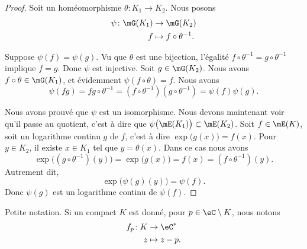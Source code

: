 \begin{proof}
    Soit un homéomorphisme \( \theta\colon K_1\to K_2\). Nous posons
    \begin{equation}
        \begin{aligned}
            \psi\colon \mG(K_1)&\to \mG(K_2)  \\
            f&\mapsto f\circ \theta^{-1}. 
        \end{aligned}
    \end{equation}
    \begin{subproof}
        \spitem[Injective]
        Suppose \( \psi(f)=\psi(g)\). Vu que \( \theta\) est une bijection, l'égalité \( f\circ \theta^{-1}=g\circ\theta^{-1}\) implique \( f=g\). Donc \( \psi\) est injective.
        \spitem[Surjective]
        Soit \( g\in\mG(K_2)\). Nous avons \( f\circ\theta\in\mG(K_1)\), et évidemment \( \psi(f\circ\theta)=f\).
        \spitem[Morphisme]
         Nous avons 
         \begin{equation}
             \psi(fg)=fg\circ\theta^{-1}=(f\circ\theta^{-1})(g\circ\theta^{-1})=\psi(f)\psi(g).
         \end{equation}
    \end{subproof}
    Nous avons prouvé que \( \psi\) est un isomorphisme. Nous devons maintenant voir qu'il passe au quotient, c'est à dire que \( \psi\big( \mE(K_1) \big)\subset\mE(K_2)\). Soit \( f\in\mE(K)\), soit un logarithme continu \( g\) de \( f\), c'est à dire \( \exp\big( g(x) \big)=f(x)\). Pour \( y\in K_2\), il existe \( x\in K_1\) tel que \( y=\theta(x)\). Dans ce cas nous avons
    \begin{equation}
        \exp\big( (g\circ\theta^{-1})(y) \big)=\exp\big( g(x) \big)=f(x)=(f\circ\theta^{-1})(y).
    \end{equation}
    Autrement dit,
    \begin{equation}
        \exp\big( \psi(g)(y) \big)=\psi(f).
    \end{equation}
    Donc \( \psi(g)\) est un logarithme continu de \( \psi(f)\).
\end{proof}

Petite notation. Si un compact \( K\) est donné, pour \( p\in\eC\setminus K\), nous notons
\begin{equation}
    \begin{aligned}
        f_p\colon K&\to \eC^* \\
        z&\mapsto z-p. 
    \end{aligned}
\end{equation}

